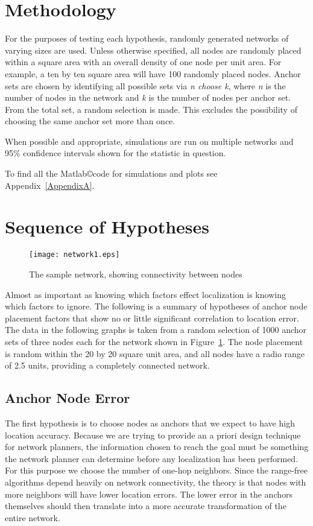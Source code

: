 \section{Methodology}
For the purposes of testing each hypothesis, randomly generated networks of varying sizes are used.  Unless otherwise specified, all nodes are randomly placed within a square area with an overall density of one node per unit area.  For example, a ten by ten square area will have 100 randomly placed nodes.  Anchor sets are chosen by identifying all possible sets via \emph{n choose k}, where \emph{n} is the number of nodes in the network and \emph{k} is the number of nodes per anchor set.  From the total set, a random selection is made.  This excludes the possibility of choosing the same anchor set more than once.

When possible and appropriate, simulations are run on multiple networks and 95\% confidence intervals shown for the statistic in question.  

To find all the Matlab\copyright code for simulations and plots see Appendix~\ref{AppendixA}.

\section{Sequence of Hypotheses}
\begin{figure}
	\centering
		\texttt{[image: network1.eps]}
	\caption{The sample network, showing connectivity between nodes}
	\label{fig:HypothesesNetwork}
\end{figure}

Almost as important as knowing which factors effect localization is knowing which factors to ignore.
The following is a summary of hypotheses of anchor node placement factors that show no or little significant correlation to location error.  The data in the following graphs is taken from a random selection of 1000 anchor sets of three nodes each for the network shown in Figure~\ref{fig:HypothesesNetwork}.  The node placement is random within the 20 by 20 square unit area, and all nodes have a radio range of 2.5 units, providing a completely connected network.

\subsection{Anchor Node Error}
The first hypothesis is to choose nodes as anchors that we expect to have high location accuracy. Because we are trying to provide an a priori design technique for network planners, the information chosen to reach the goal must be something the network planner can determine before any localization has been performed.  For this purpose we choose the number of one-hop neighbors.  Since the range-free algorithms depend heavily on network connectivity, the theory is that nodes with more neighbors will have lower location errors.  The lower error in the anchors themselves should then translate into a more accurate transformation of the entire network.

